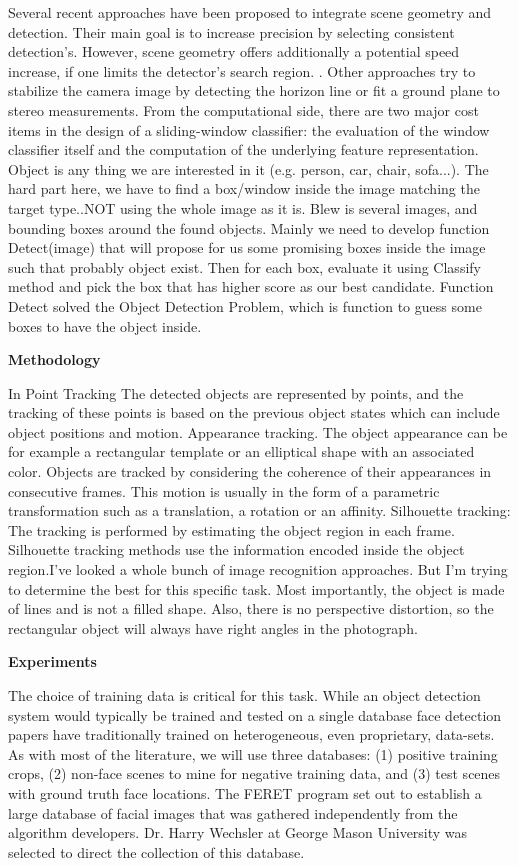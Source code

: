 \documentclass[12pt]{article}
\begin{document}
Several recent approaches have been proposed to integrate scene geometry and detection. Their main goal is to increase precision by selecting consistent detection's. However, scene geometry offers additionally a potential speed increase, if one limits the detector's search region. . Other approaches try to stabilize the camera image by detecting the horizon line or fit a ground plane to stereo measurements. From the computational side, there are two major cost items in the design of a sliding-window classifier: the evaluation of the window classifier itself and the computation of the underlying feature representation. Object is any thing we are interested in it (e.g. person, car, chair, sofa...). The hard part here, we have to find a box/window inside the image matching the target type..NOT using the whole image as it is. Blew is several images, and bounding boxes around the found objects. Mainly we need to develop function Detect(image) that will propose for us some promising boxes inside the image such that probably object exist. Then for each box, evaluate it using Classify method and pick the box that has higher score as our best candidate. Function Detect solved the Object Detection Problem, which is function to guess some boxes to have the object inside.

\textbf{Methodology}

In Point Tracking The detected objects are represented by points, and the tracking of these points is based on the previous object states which can include
object positions and motion. Appearance tracking. The object appearance can be for example a rectangular template or an elliptical shape with an associated  color. Objects are tracked by considering the coherence of their appearances in consecutive frames. This motion is usually in the form of a parametric
transformation such as a translation, a rotation or an affinity. Silhouette tracking: The tracking is performed by estimating the object region in each frame. Silhouette tracking methods use the information encoded inside the object region.I've looked a whole bunch of image recognition approaches. But I'm trying to determine the best for this specific task. Most importantly, the object is made of lines and is not a filled shape. Also, there is no perspective distortion, so the rectangular object will always have right angles in the photograph.


\textbf{Experiments}

The choice of training data is critical for this task. While an object detection system would typically be trained and tested on a single database face detection papers have traditionally trained on heterogeneous, even proprietary, data-sets. As with most of the literature, we will use three databases: (1) positive training crops, (2) non-face scenes to mine for negative training data, and (3) test scenes with ground truth face locations. The FERET program set out to establish a large database of facial images that was gathered independently from the algorithm developers. Dr. Harry Wechsler at George Mason University was selected to direct the collection of this database. 
\end{document}
